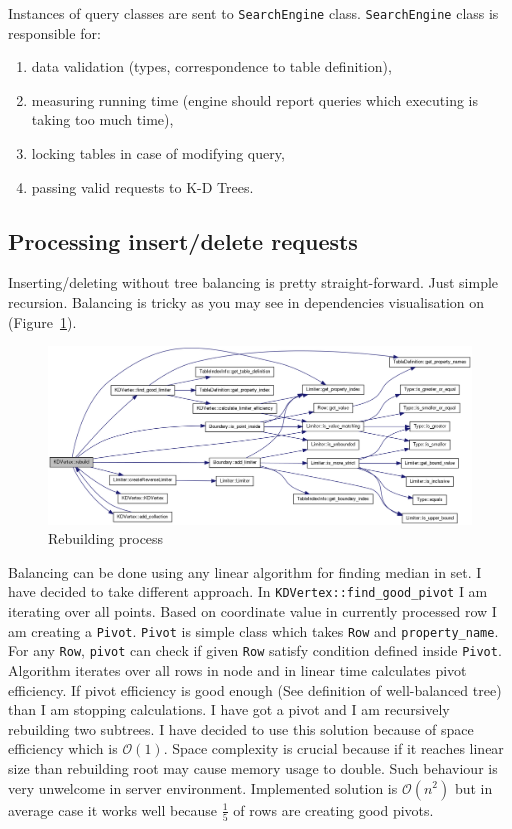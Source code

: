 \documentclass[10pt,a4paper]{article}
\newcommand{\Oh}{\mathcal{O}}
\begin{document}
Instances of query classes are sent to \verb|SearchEngine| class. \verb|SearchEngine| class is responsible for:
\begin{enumerate}
\item data validation (types, correspondence to table definition),
\item measuring running time (engine should report queries which executing is taking too much time),
\item locking tables in case of modifying query,
\item passing valid requests to K-D Trees.
\end{enumerate}

\subsection{Processing insert/delete requests}

Inserting/deleting without tree balancing is pretty straight-forward. Just simple recursion. Balancing is tricky as you may see in dependencies visualisation on (Figure~\ref{fig:rebuild}).

\begin{figure}
\centering
  \includegraphics[width=16cm]{rebuild}
  \caption{Rebuilding process}
  \label{fig:rebuild}
\end{figure}

Balancing can be done using any linear algorithm for finding median in set. I have decided to take different approach. In \verb|KDVertex::find_good_pivot| I am iterating over all points. Based on coordinate value in currently processed row I am creating a \verb|Pivot|. \verb|Pivot| is simple class which takes \verb|Row| and \verb|property_name|. For any \verb|Row|, \verb|pivot| can check if given \verb|Row| satisfy condition defined inside \verb|Pivot|. Algorithm iterates over all rows in node and in linear time calculates pivot efficiency. If pivot efficiency is good enough (See definition of well-balanced tree) than I am stopping calculations. I have got a pivot and I am recursively rebuilding two subtrees. I have decided to use this solution because of space efficiency which is $\Oh(1)$. Space complexity is crucial because if it reaches linear size than rebuilding root may cause memory usage to double. Such behaviour is very unwelcome in server environment. Implemented solution is $\Oh(n^2)$ but in average case it works well because $\frac{1}{5}$ of rows are creating good pivots.
\end{document}
